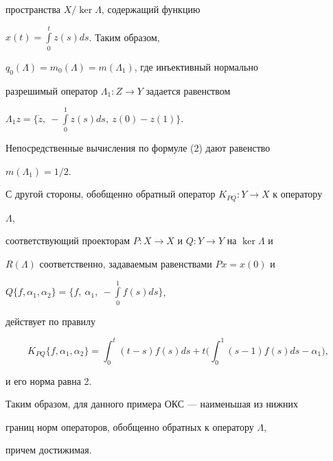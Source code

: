 \begin{exam}
пространства $X/\ker\Lambda$, содержащий функцию 


$x(t)=\int\limits^t_0z(s)ds$. Таким образом, 


$q_0(\Lambda)=m_0(\Lambda)=m(\Lambda_1)$, где инъективный нормально 


разрешимый оператор $\Lambda_1:Z\to{}Y$ задается равенством 


$\Lambda_1z=\Big\{\Dot z,\ -\int\limits^1_0z(s)ds,\ z(0)-z(1)\Big\}$. 


Непосредственные вычисления по формуле (2) дают равенство 


$m(\Lambda_1)=1/2$. 


 


С другой стороны, обобщенно обратный оператор $K_{PQ}:Y\to{}X$ к оператору 


$\Lambda$, 


соответствующий проекторам $P:X\to{}X$ и $Q:Y\to{}Y$ на $\ker\Lambda$ и 


$R(\Lambda)$ соответственно, задаваемым равенствами $Px=x(0)$ и 


$Q\{f,\alpha_1,\alpha_2\}= 


\Big\{f,\ \alpha_1,\ -\int\limits^1_0f(s)ds\Big\}$, 


действует по правилу 


$$ 


K_{PQ}\{f,\alpha_1,\alpha_2\}=\int^t_0(t-s)f(s)ds+ 


t\bigg(\int^1_0(s-1)f(s)ds-\alpha_1\bigg), 


$$ 


и его норма равна 2.  


 


Таким образом, для данного примера ОКС --- наименьшая из нижних 


границ норм операторов, обобщенно обратных к оператору $\Lambda$, 


причем достижимая. 


\end{exam} 


 


